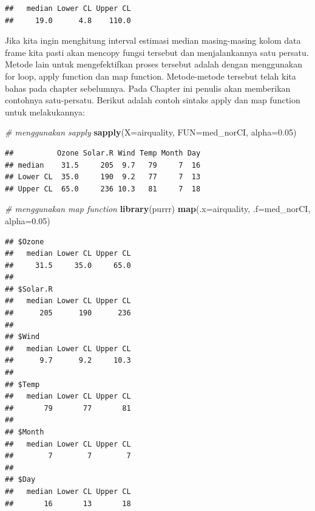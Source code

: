 \documentclass[]{book}
\newenvironment{Shaded}{\begin{snugshade}}{\end{snugshade}}
\newcommand{\KeywordTok}[1]{\textcolor[rgb]{0.13,0.29,0.53}{\textbf{#1}}}
\newcommand{\DataTypeTok}[1]{\textcolor[rgb]{0.13,0.29,0.53}{#1}}
\newcommand{\FloatTok}[1]{\textcolor[rgb]{0.00,0.00,0.81}{#1}}
\newcommand{\CommentTok}[1]{\textcolor[rgb]{0.56,0.35,0.01}{\textit{#1}}}
\newcommand{\OperatorTok}[1]{\textcolor[rgb]{0.81,0.36,0.00}{\textbf{#1}}}
\newcommand{\NormalTok}[1]{#1}
\begin{document}
\begin{Shaded}
\end{Shaded}

\begin{verbatim}
##   median Lower CL Upper CL 
##     19.0      4.8    110.0
\end{verbatim}

Jika kita ingin menghitung interval estimasi median masing-masing kolom
data frame kita pasti akan mencopy fungsi tersebut dan menjalankannya
satu persatu. Metode lain untuk mengefektifkan proses tersebut adalah
dengan menggunakan for loop, apply function dan map function.
Metode-metode tersebut telah kita bahas pada chapter sebelumnya. Pada
Chapter ini penulis akan memberikan contohnya satu-persatu. Berikut
adalah contoh sintaks apply dan map function untuk melakukannya:

\begin{Shaded}
\begin{Highlighting}[]
\CommentTok{# menggunakan sapply}
\KeywordTok{sapply}\NormalTok{(}\DataTypeTok{X=}\NormalTok{airquality, }\DataTypeTok{FUN=}\NormalTok{med_norCI, }\DataTypeTok{alpha=}\FloatTok{0.05}\NormalTok{)}
\end{Highlighting}
\end{Shaded}

\begin{verbatim}
##          Ozone Solar.R Wind Temp Month Day
## median    31.5     205  9.7   79     7  16
## Lower CL  35.0     190  9.2   77     7  13
## Upper CL  65.0     236 10.3   81     7  18
\end{verbatim}

\begin{Shaded}
\begin{Highlighting}[]
\CommentTok{# menggunakan map function}
\KeywordTok{library}\NormalTok{(purrr)}
\KeywordTok{map}\NormalTok{(}\DataTypeTok{.x=}\NormalTok{airquality, }\DataTypeTok{.f=}\NormalTok{med_norCI, }\DataTypeTok{alpha=}\FloatTok{0.05}\NormalTok{)}
\end{Highlighting}
\end{Shaded}

\begin{verbatim}
## $Ozone
##   median Lower CL Upper CL 
##     31.5     35.0     65.0 
## 
## $Solar.R
##   median Lower CL Upper CL 
##      205      190      236 
## 
## $Wind
##   median Lower CL Upper CL 
##      9.7      9.2     10.3 
## 
## $Temp
##   median Lower CL Upper CL 
##       79       77       81 
## 
## $Month
##   median Lower CL Upper CL 
##        7        7        7 
## 
## $Day
##   median Lower CL Upper CL 
##       16       13       18
\end{verbatim}
\end{document}
